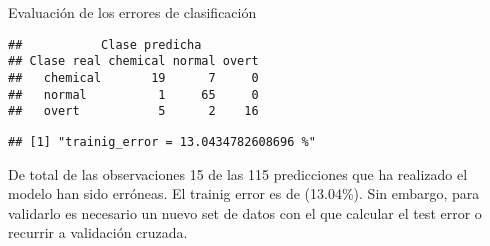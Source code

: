 \documentclass[ignorenonframetext,]{beamer}
\newenvironment{Shaded}{\begin{snugshade}}{\end{snugshade}}
\newcommand{\KeywordTok}[1]{\textcolor[rgb]{0.13,0.29,0.53}{\textbf{#1}}}
\newcommand{\DataTypeTok}[1]{\textcolor[rgb]{0.13,0.29,0.53}{#1}}
\newcommand{\DecValTok}[1]{\textcolor[rgb]{0.00,0.00,0.81}{#1}}
\newcommand{\StringTok}[1]{\textcolor[rgb]{0.31,0.60,0.02}{#1}}
\newcommand{\OperatorTok}[1]{\textcolor[rgb]{0.81,0.36,0.00}{\textbf{#1}}}
\newcommand{\NormalTok}[1]{#1}
\begin{document}
\begin{frame}[fragile]{Evaluación de los errores de clasificación}

\hypertarget{left}{}
\begin{verbatim}
##           Clase predicha
## Clase real chemical normal overt
##   chemical       19      7     0
##   normal          1     65     0
##   overt           5      2    16
\end{verbatim}

\begin{verbatim}
## [1] "trainig_error = 13.0434782608696 %"
\end{verbatim}

De total de las observaciones 15 de las 115 predicciones que ha
realizado el modelo han sido erróneas. El trainig error es de (13.04\%).
Sin embargo, para validarlo es necesario un nuevo set de datos con el
que calcular el test error o recurrir a validación cruzada.

\hypertarget{right}{}
\begin{Shaded}
\end{Shaded}

\end{frame}
\end{document}
